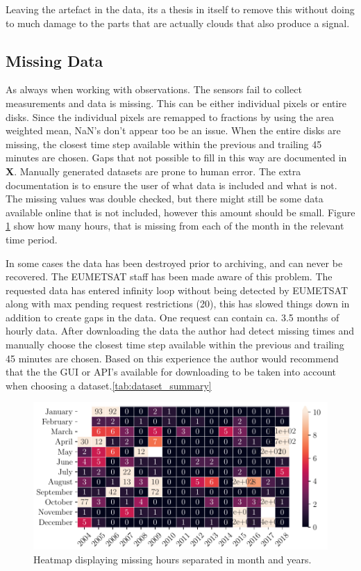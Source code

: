 Leaving the artefact in the data, its a thesis in itself to remove this without doing to much damage to the parts that are actually clouds that also produce a signal.

\subsection{Missing Data} \label{sec:missing_values}
As always when working with observations. The sensors fail to collect  measurements and data is missing. This can be either individual pixels or entire disks. Since the individual pixels are remapped to fractions by using the area weighted mean, NaN's don't appear too be an issue. When the entire disks are missing, the closest time step available within the previous and trailing 45 minutes are chosen. Gaps that not possible to fill in this way are documented in \textbf{X}. Manually generated datasets are prone to human error. The extra documentation is to ensure the user of what data is included and what is not. The missing values was double checked, but there might still be some data available online that is not included, however this amount should be small. Figure \ref{fig:heatmap_missing_values} show how many hours, that is missing from each of the month in the relevant time period. 

In some cases the data has been destroyed prior to archiving, and can never be recovered. The EUMETSAT staff has been made aware of this problem. The requested data has entered infinity loop without being detected by EUMETSAT along with max pending request restrictions (20), this has slowed things down in addition to create gaps in the data. One request can contain ca. 3.5 months of hourly data. After downloading the data the author had detect missing times and manually choose the closest time step available within the previous and trailing 45 minutes are chosen. Based on this experience the author would recommend that the the GUI or API's available for downloading to be taken into account when choosing a dataset.\ref{tab:dataset_summary}

\begin{figure}
    \centering
    \includegraphics[scale = 1.0]{python_figs/heatmap_missing_values.pdf}
    \caption[Heatmap showing missing hours for all months or years.]{Heatmap displaying missing hours separated in month and years.}
    \label{fig:heatmap_missing_values}
\end{figure}

